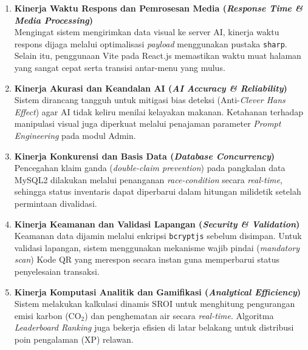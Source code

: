 \begin{enumerate}
    \item \textbf{Kinerja Waktu Respons dan Pemrosesan Media (\textit{Response Time \& Media Processing})} \\
    Mengingat sistem mengirimkan data visual ke server AI, kinerja waktu respons dijaga melalui optimalisasi \textit{payload} menggunakan pustaka \texttt{sharp}. Selain itu, penggunaan Vite pada React.js memastikan waktu muat halaman yang sangat cepat serta transisi antar-menu yang mulus.
    
    \item \textbf{Kinerja Akurasi dan Keandalan AI (\textit{AI Accuracy \& Reliability})} \\
    Sistem dirancang tangguh untuk mitigasi bias deteksi (Anti-\textit{Clever Hans Effect}) agar AI tidak keliru menilai kelayakan makanan. Ketahanan terhadap manipulasi visual juga diperkuat melalui penajaman parameter \textit{Prompt Engineering} pada modul Admin.
    
    \item \textbf{Kinerja Konkurensi dan Basis Data (\textit{Database Concurrency})} \\
    Pencegahan klaim ganda (\textit{double-claim prevention}) pada pangkalan data MySQL2 dilakukan melalui penanganan \textit{race-condition} secara \textit{real-time}, sehingga status inventaris dapat diperbarui dalam hitungan milidetik setelah permintaan divalidasi.
    
    \item \textbf{Kinerja Keamanan dan Validasi Lapangan (\textit{Security \& Validation})} \\
    Keamanan data dijamin melalui enkripsi \texttt{bcryptjs} sebelum disimpan. Untuk validasi lapangan, sistem menggunakan mekanisme wajib pindai (\textit{mandatory scan}) Kode QR yang merespon secara instan guna memperbarui status penyelesaian transaksi.
    
    \item \textbf{Kinerja Komputasi Analitik dan Gamifikasi (\textit{Analytical Efficiency})} \\
    Sistem melakukan kalkulasi dinamis SROI untuk menghitung pengurangan emisi karbon (CO$_2$) dan penghematan air secara \textit{real-time}. Algoritma \textit{Leaderboard Ranking} juga bekerja efisien di latar belakang untuk distribusi poin pengalaman (XP) relawan.
\end{enumerate}